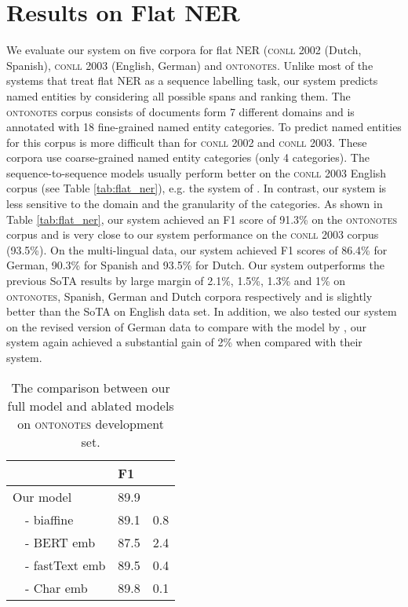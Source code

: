 \documentclass[11pt,a4paper]{article}
\newcommand{\ACRO}[1]{\textsc{#1}}
\newcommand{\CONLLTWO}{\ACRO{conll 2002}}
\newcommand{\CONLLTHREE}{\ACRO{conll 2003}}
\newcommand{\ONTONOTES}{\ACRO{ontonotes}}
\begin{document}
\section{Results on Flat NER}
We evaluate our system on five corpora for flat NER ({\CONLLTWO} (Dutch, Spanish), {\CONLLTHREE} (English, German) and {\ONTONOTES}. Unlike most of the systems that treat flat NER as a sequence labelling task, our system predicts named entities by considering all possible spans and ranking them. The {\ONTONOTES} corpus consists of documents form 7 different domains and is annotated with 18 fine-grained named entity categories. To predict named entities for this corpus is more difficult than for {\CONLLTWO} and {\CONLLTHREE}. These corpora use coarse-grained named entity categories (only 4 categories). The sequence-to-sequence models usually perform better on the {\CONLLTHREE} English corpus (see Table \ref{tab:flat_ner}), e.g. the system of . In contrast, our system is less sensitive to the domain and the granularity of the categories. As shown in Table \ref{tab:flat_ner}, our system achieved an F1 score of 91.3\% on the {\ONTONOTES} corpus and is very close to our system performance on the {\CONLLTHREE} corpus (93.5\%). 
On the multi-lingual data, our system achieved F1 scores of 86.4\% for German, 90.3\% for Spanish and 93.5\% for Dutch. Our system outperforms the previous SoTA results by large margin of 2.1\%, 1.5\%, 1.3\% and 1\% on {\ONTONOTES}, Spanish, German and Dutch corpora respectively and is slightly better than the SoTA on English data set. In addition, we also tested our system on the revised version of German data to compare with the model by , our system again achieved a substantial gain of 2\% when compared with their system.

\begin{table}[t]
\centering
\begin{tabular}{l l l}
\toprule
&\bf F1& \bf \\
\midrule
Our model&89.9&\\
\ \ - biaffine&89.1&0.8\\
\ \ - BERT emb&87.5&2.4\\
\ \ - fastText emb&89.5&0.4\\
\ \ - Char emb&89.8&0.1\\
\bottomrule
\end{tabular}
\caption{\label{table:analysis} The comparison between our full model and ablated models on {\ONTONOTES} development set.}
\end{table}
\end{document}
